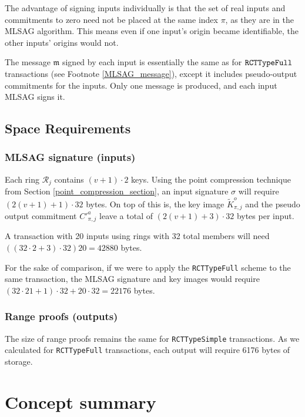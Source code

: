 The advantage of signing inputs individually is that the set of real inputs and commitments to zero need not be placed at the same index $\pi$, as they are in the MLSAG algorithm. This means even if one input's origin became identifiable, the other inputs' origins would not.

The message $\mathfrak{m}$ signed by each input is essentially the same as for $\tt RCTTypeFull$ transactions (see Footnote \ref{MLSAG_message}), except it includes pseudo-output commitments for the inputs. Only one message is produced, and each input MLSAG signs it.


\subsection{Space Requirements}

\subsubsection*{MLSAG signature (inputs)}

Each ring \(\mathcal{R}_j\) contains \((v+1) \cdot 2\) keys. Using the point compression technique from Section \ref{point_compression_section}, an input signature $\sigma$ will require \( (2(v+1) + 1) \cdot 32  \) bytes. On top of this is, the key image $\tilde{K}^o_{\pi,j}$ and the pseudo output commitment $C'^a_{\pi,j}$ leave a total of $(2(v+1)+3) \cdot 32$ bytes per input.

A transaction with 20 inputs using rings with 32 total members will need \(((32 \cdot 2 + 3) \cdot 32) 20 = 42880 \) bytes.

For the sake of comparison, if we were to apply the {\tt RCTTypeFull} scheme to the same transaction, the MLSAG signature and key images would require \(( 32 \cdot 21 + 1) \cdot 32 + 20 \cdot 32 = 22176\) bytes.


\subsubsection*{Range proofs (outputs)}

The size of range proofs remains the same for {\tt RCTTypeSimple} transactions. As we calculated for {\tt RCTTypeFull} transactions, each output will require 6176 bytes of storage.



\newpage
\section{Concept summary}
\label{sec:transaction_summary}


